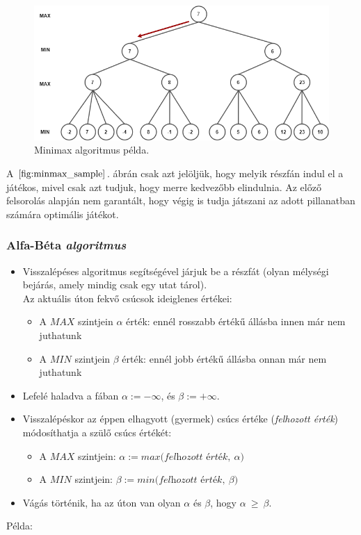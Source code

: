 \documentclass[12pt,margin=0px]{article}
\begin{document}
{    \begin{figure}[H]
		\centering
        \includegraphics[width=0.8\linewidth]{img/minmax_sample.png}
		\caption{Minimax algoritmus példa.}
		\label{fig:minmax_sample}
	\end{figure}

    \noindent A $\ref{fig:minmax_sample}$. ábrán csak azt jelöljük, hogy melyik részfán indul el a játékos, mivel csak azt tudjuk, hogy merre kedvezőbb elindulnia. Az előző felsorolás alapján nem garantált, hogy végig is tudja játszani az adott pillanatban számára optimális játékot.

    \subsubsection*{Alfa-Béta \emph{algoritmus}}
    \begin{itemize}
    \item Visszalépéses algoritmus segítségével járjuk be a részfát (olyan mélységi bejárás, amely mindig csak egy utat tárol).\\
    Az aktuális úton fekvő csúcsok ideiglenes értékei:
    \begin{itemize}
        \item A $MAX$ szintjein $\alpha$ érték: ennél rosszabb értékű állásba innen már nem juthatunk
        \item A $MIN$ szintjein $\beta$ érték: ennél jobb értékű állásba onnan már nem juthatunk
    \end{itemize}
    \item Lefelé haladva a fában $\alpha:= -\infty$, és $\beta:= +\infty$.
    \item Visszalépéskor az éppen elhagyott (gyermek) csúcs értéke (\emph{felhozott érték}) módosíthatja a szülő csúcs értékét:
    \begin{itemize}
        \item A $MAX$ szintjein: $\alpha:= max\Big(\textit{felhozott érték},\ \alpha\Big)$
        \item A $MIN$ szintjein: $\beta:= min\Big(\textit{felhozott érték},\ \beta\Big)$
    \end{itemize}
    \item Vágás történik, ha az úton van olyan $\alpha$ és $\beta$, hogy $\alpha\ \geq\ \beta$.\\
    \end{itemize}
    \newpage
    Példa:\\

}
\end{document}

